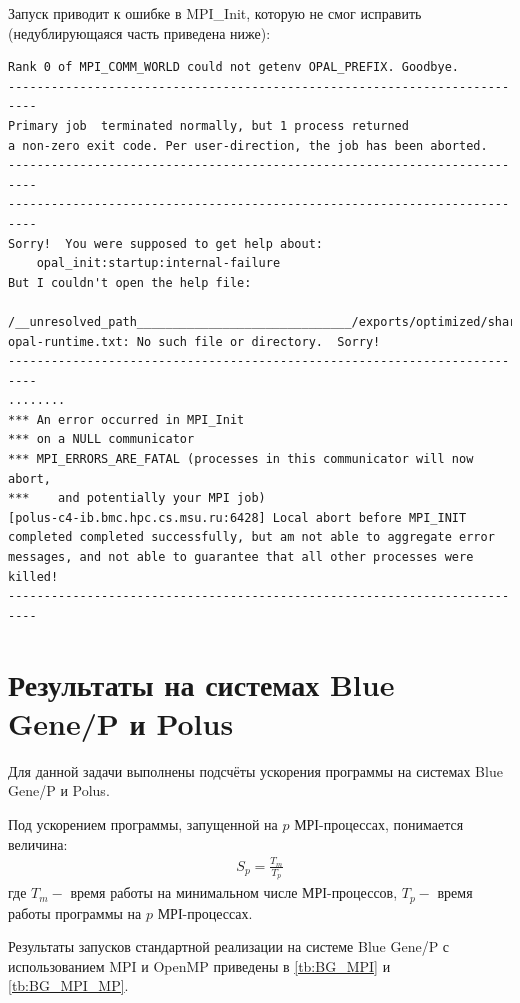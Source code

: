 \documentclass[12pt, fleqn]{article}
\theoremstyle{definition}
\begin{document}
Запуск приводит к ошибке в MPI\_Init, которую не смог исправить (недублирующаяся часть приведена ниже):
\begin{lstlisting}
Rank 0 of MPI_COMM_WORLD could not getenv OPAL_PREFIX. Goodbye.
--------------------------------------------------------------------------
Primary job  terminated normally, but 1 process returned
a non-zero exit code. Per user-direction, the job has been aborted.
--------------------------------------------------------------------------
--------------------------------------------------------------------------
Sorry!  You were supposed to get help about:
    opal_init:startup:internal-failure
But I couldn't open the help file:
    /__unresolved_path______________________________/exports/optimized/share/spectrum_mpi/help-opal-runtime.txt: No such file or directory.  Sorry!
--------------------------------------------------------------------------
........
*** An error occurred in MPI_Init
*** on a NULL communicator
*** MPI_ERRORS_ARE_FATAL (processes in this communicator will now abort,
***    and potentially your MPI job)
[polus-c4-ib.bmc.hpc.cs.msu.ru:6428] Local abort before MPI_INIT completed completed successfully, but am not able to aggregate error messages, and not able to guarantee that all other processes were killed!
--------------------------------------------------------------------------
\end{lstlisting}
\section{Результаты на системах Blue Gene/P и Polus}
Для данной задачи выполнены подсчёты ускорения программы на системах Blue Gene/P и Polus.

Под ускорением программы, запущенной на $p$ МРІ-процессах, понимается величина:
\abovedisplayskip=-1pt
\belowdisplayskip=-1pt
\noindent
\begin{gather*}
S_{p}=\frac{T_{m}}{T_{p}}
\end{gather*}
где $T_{m}-$ время работы на минимальном числе МРІ-процессов, $T_{p}-$ время работы программы на $p$ МРІ-процессах.  

Результаты запусков стандартной реализации на системе Blue Gene/P с использованием MPI и OpenMP приведены в \ref{tb:BG_MPI} и \ref{tb:BG_MPI_MP}. 
\end{document}
